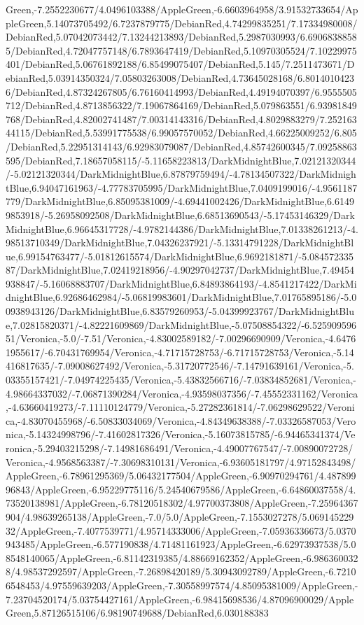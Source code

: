 {\begin{tikzternal}
Green,-7.2552230677/4.0496103388/AppleGreen,-6.6603964958/3.91532733654/AppleGreen,5.14073705492/6.7237879775/DebianRed,4.74299835251/7.17334980008/DebianRed,5.07042073442/7.13244213893/DebianRed,5.2987030993/6.69068388585/DebianRed,4.72047757148/6.7893647419/DebianRed,5.10970305524/7.10229975401/DebianRed,5.06761892188/6.85499075407/DebianRed,5.145/7.2511473671/DebianRed,5.03914350324/7.05803263008/DebianRed,4.73645028168/6.80140104236/DebianRed,4.87324267805/6.76160414993/DebianRed,4.49194070397/6.9555505712/DebianRed,4.8713856322/7.19067864169/DebianRed,5.079863551/6.93981849768/DebianRed,4.82002741487/7.00314143316/DebianRed,4.8029883279/7.25216344115/DebianRed,5.53991775538/6.99057570052/DebianRed,4.66225009252/6.805/DebianRed,5.22951314143/6.92983079087/DebianRed,4.85742600345/7.09258863595/DebianRed,7.18657058115/-5.11658223813/DarkMidnightBlue,7.02121320344/-5.02121320344/DarkMidnightBlue,6.87879759494/-4.78134507322/DarkMidnightBlue,6.94047161963/-4.77783705995/DarkMidnightBlue,7.0409199016/-4.9561187779/DarkMidnightBlue,6.85095381009/-4.69441002426/DarkMidnightBlue,6.61499853918/-5.26958092508/DarkMidnightBlue,6.68513690543/-5.17453146329/DarkMidnightBlue,6.96645317728/-4.9782144386/DarkMidnightBlue,7.01338261213/-4.98513710349/DarkMidnightBlue,7.04326237921/-5.13314791228/DarkMidnightBlue,6.99154763477/-5.01812615574/DarkMidnightBlue,6.9692181871/-5.08457233587/DarkMidnightBlue,7.02419218956/-4.90297042737/DarkMidnightBlue,7.49454938847/-5.16068883707/DarkMidnightBlue,6.84893864193/-4.8541217422/DarkMidnightBlue,6.92686462984/-5.06819983601/DarkMidnightBlue,7.01765895186/-5.00938943126/DarkMidnightBlue,6.83579260953/-5.04399923767/DarkMidnightBlue,7.02815820371/-4.82221609869/DarkMidnightBlue,-5.07508854322/-6.52590959651/Veronica,-5.0/-7.51/Veronica,-4.83002589182/-7.00296690909/Veronica,-4.64761955617/-6.70431769954/Veronica,-4.71715728753/-6.71715728753/Veronica,-5.14416817635/-7.09008627492/Veronica,-5.31720772546/-7.14791639161/Veronica,-5.03355157421/-7.04974225435/Veronica,-5.43832566716/-7.03834852681/Veronica,-4.98664337032/-7.06871390284/Veronica,-4.93598037356/-7.45552331162/Veronica,-4.63660419273/-7.11110124779/Veronica,-5.27282361814/-7.06298629522/Veronica,-4.83070455968/-6.50833034069/Veronica,-4.84349638388/-7.03326587053/Veronica,-5.14324998796/-7.41602817326/Veronica,-5.16073815785/-6.94465341374/Veronica,-5.29403215298/-7.14981686491/Veronica,-4.49007767547/-7.00890072728/Veronica,-4.9568563387/-7.30698310131/Veronica,-6.93605181797/4.97152843498/AppleGreen,-6.78961295369/5.06432177504/AppleGreen,-6.90970294761/4.48789996843/AppleGreen,-6.95229775116/5.24540679586/AppleGreen,-6.64860037558/4.73520138981/AppleGreen,-6.78120518302/4.97700373808/AppleGreen,-7.25964367904/4.98639265138/AppleGreen,-7.0/5.0/AppleGreen,-7.1553027278/5.06914522932/AppleGreen,-7.4077539771/4.95714333006/AppleGreen,-7.05936336673/5.0370943485/AppleGreen,-6.577190838/4.71481161923/AppleGreen,-6.62973937538/5.08548140065/AppleGreen,-6.81142319385/4.88669162352/AppleGreen,-6.9863600328/4.98537292597/AppleGreen,-7.26898420189/5.30943092789/AppleGreen,-6.72106548453/4.97559639203/AppleGreen,-7.30558997574/4.85095381009/AppleGreen,-7.23704520174/5.03754427161/AppleGreen,-6.98415698536/4.87096900029/AppleGreen,5.87126515106/6.98190749688/DebianRed,6.030188383
\end{tikzternal}}
